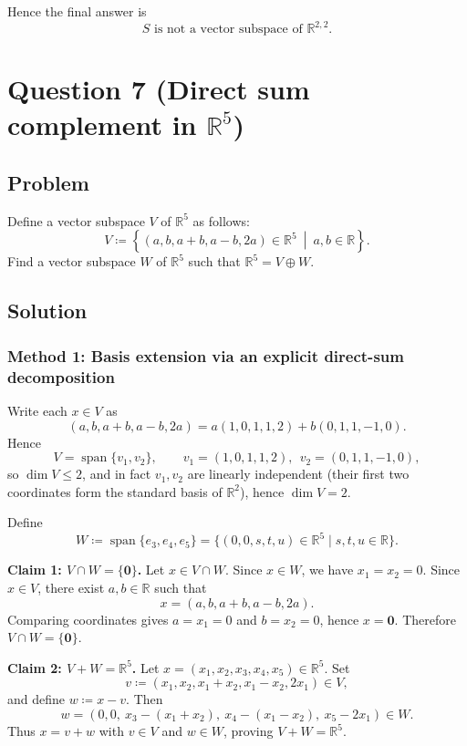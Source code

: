 \documentclass[12pt]{article}
\begin{document}
Hence the final answer is
\[
\boxed{\text{\(S\) is not a vector subspace of \(\mathbb{R}^{2,2}\).}}
\]



\newpage
\section{Question 7 (Direct sum complement in \(\mathbb{R}^5\))}
\subsection{Problem}
Define a vector subspace \(V\) of \(\mathbb{R}^5\) as follows:
\[
V \coloneqq \left\{(a,b,a+b,a-b,2a)\in\mathbb{R}^5 \ \middle|\ a,b\in\mathbb{R}\right\}.
\]
Find a vector subspace \(W\) of \(\mathbb{R}^5\) such that \(\mathbb{R}^5 = V \oplus W\).

\subsection{Solution}

\subsubsection{Method 1: Basis extension via an explicit direct-sum decomposition}
Write each \(x\in V\) as
\[
(a,b,a+b,a-b,2a)=a(1,0,1,1,2)+b(0,1,1,-1,0).
\]
Hence
\[
V=\operatorname{span}\{v_1,v_2\},\qquad 
v_1=(1,0,1,1,2),\ \ v_2=(0,1,1,-1,0),
\]
so \(\dim V\le 2\), and in fact \(v_1,v_2\) are linearly independent (their first two coordinates form the standard basis of \(\mathbb{R}^2\)), hence \(\dim V=2\).

Define
\[
W \coloneqq \operatorname{span}\{e_3,e_4,e_5\}
= \{(0,0,s,t,u)\in \mathbb{R}^5 \mid s,t,u\in\mathbb{R}\}.
\]

\textbf{Claim 1: \(V\cap W=\{\mathbf{0}\}\).}
Let \(x\in V\cap W\). Since \(x\in W\), we have \(x_1=x_2=0\). Since \(x\in V\), there exist \(a,b\in\mathbb{R}\) such that
\[
x=(a,b,a+b,a-b,2a).
\]
Comparing coordinates gives \(a=x_1=0\) and \(b=x_2=0\), hence \(x=\mathbf{0}\). Therefore \(V\cap W=\{\mathbf{0}\}\).

\textbf{Claim 2: \(V+W=\mathbb{R}^5\).}
Let \(x=(x_1,x_2,x_3,x_4,x_5)\in\mathbb{R}^5\). Set
\[
v \coloneqq (x_1,x_2,x_1+x_2,x_1-x_2,2x_1)\in V,
\]
and define \(w\coloneqq x-v\). Then
\[
w=(0,0,\ x_3-(x_1+x_2),\ x_4-(x_1-x_2),\ x_5-2x_1)\in W.
\]
Thus \(x=v+w\) with \(v\in V\) and \(w\in W\), proving \(V+W=\mathbb{R}^5\).
\end{document}

